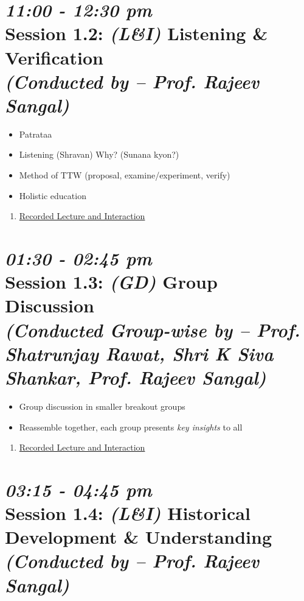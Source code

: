 \documentclass[11pt]{article}
\begin{document}
    \section*{{\it 11:00 - 12:30 pm} \\
    Session 1.2: {\it (L\&I)} {\bf Listening \& Verification} \\
    {\Large\it (Conducted by -- Prof. Rajeev Sangal)}}

    \begin{itemize}
        \item Patrataa
        \item Listening (Shravan) Why? (Sunana kyon?)
        \item Method of TTW (proposal, examine/experiment, verify)
        \item Holistic education
    \end{itemize}

    \begin{enumerate}
        \item \href{https://www.youtube.com/watch?v=LB-8bVjFV2Y}{Recorded Lecture and Interaction}
    \end{enumerate}

    \section*{{\it 01:30 - 02:45 pm} \\
    Session 1.3: {\it (GD)} Group Discussion \\
    {\Large\it (Conducted Group-wise by -- Prof. Shatrunjay Rawat, Shri K Siva Shankar, Prof. Rajeev Sangal)}}

    \begin{itemize}
        \item Group discussion in smaller breakout groups
        \item Reassemble together, each group presents {\em key insights} to all
    \end{itemize}

    \begin{enumerate}
        \item \href{https://www.youtube.com/watch?v=1wokepZKghY}{Recorded Lecture and Interaction}
    \end{enumerate}


    \section*{{\it 03:15 - 04:45 pm} \\
    Session 1.4: {\it (L\&I)} {\bf Historical Development \& Understanding} \\
    {\Large\it (Conducted by -- Prof. Rajeev Sangal)}}
\end{document}
